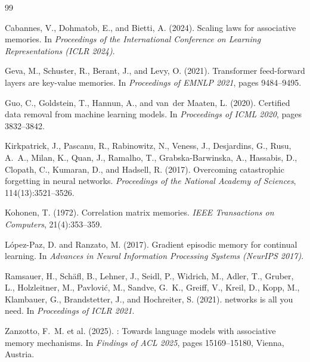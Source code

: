 \documentclass{ceurart}
\begin{document}
\begin{thebibliography}{99}

Cabannes, V., Dohmatob, E., and Bietti, A. (2024).
\newblock Scaling laws for associative memories.
\newblock In \emph{Proceedings of the International Conference on Learning
  Representations (ICLR 2024)}.

Geva, M., Schuster, R., Berant, J., and Levy, O. (2021).
\newblock Transformer feed-forward layers are key-value memories.
\newblock In \emph{Proceedings of EMNLP 2021}, pages 9484--9495.

Guo, C., Goldstein, T., Hannun, A., and van~der Maaten, L. (2020).
\newblock Certified data removal from machine learning models.
\newblock In \emph{Proceedings of ICML 2020}, pages 3832--3842.

Kirkpatrick, J., Pascanu, R., Rabinowitz, N., Veness, J., Desjardins, G.,
  Rusu, A.~A., Milan, K., Quan, J., Ramalho, T., Grabska-Barwinska, A.,
  Hassabis, D., Clopath, C., Kumaran, D., and Hadsell, R. (2017).
\newblock Overcoming catastrophic forgetting in neural networks.
\newblock \emph{Proceedings of the National Academy of Sciences},
  114(13):3521--3526.

Kohonen, T. (1972).
\newblock Correlation matrix memories.
\newblock \emph{IEEE Transactions on Computers}, 21(4):353--359.

L{\'o}pez-Paz, D. and Ranzato, M. (2017).
\newblock Gradient episodic memory for continual learning.
\newblock In \emph{Advances in Neural Information Processing Systems
  (NeurIPS 2017)}.

Ramsauer, H., Sch\"{a}fl, B., Lehner, J., Seidl, P., Widrich, M.,
  Adler, T., Gruber, L., Holzleitner, M., Pavlovi\'{c}, M.,
  Sandve, G.~K., Greiff, V., Kreil, D., Kopp, M., Klambauer, G.,
  Brandstetter, J., and Hochreiter, S. (2021).
 networks is all you need.
\newblock In \emph{Proceedings of ICLR 2021}.

Zanzotto, F.~M. et al. (2025).
: Towards language models with associative memory mechanisms.
\newblock In \emph{Findings of ACL 2025}, pages 15169--15180, Vienna, Austria.

\end{thebibliography}
\end{document}
